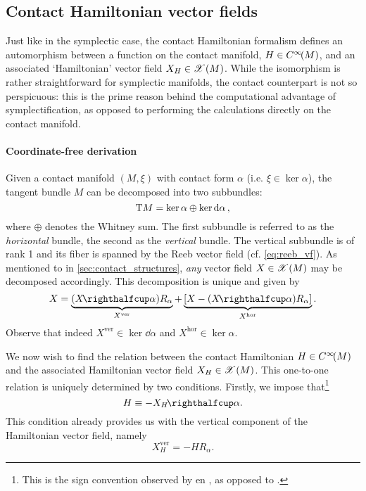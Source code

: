 \subsection{Contact Hamiltonian vector fields}
\label{ssec:contact_ham_vfields}
Just like in the symplectic case, the contact Hamiltonian formalism defines an automorphism between a function on the contact manifold, $H \in C^\infty\!\qty(M)$, and an associated `Hamiltonian' vector field $X_H \in \mathscr{X}\qty(M)$. While the isomorphism is rather straightforward for symplectic manifolds, the contact counterpart is not so perspicuous: this is the prime reason behind the computational advantage of symplectification, as opposed to performing the calculations directly on the contact manifold.
\paragraph{Coordinate-free derivation} Given a contact manifold $(M, \xi)$ with contact form $\alpha$ (i.e. $\xi \in \ker \alpha$), the tangent bundle $M$ can be decomposed into two subbundles: \cite{Libermann1987,Cannas2001}
$$ \mathrm{T}M = \ker \alpha \oplus \ker \dd{\alpha}, $$
where $\oplus$ denotes the Whitney sum. The first subbundle is referred to as the \emph{horizontal} bundle, the second as the \emph{vertical}
 bundle. The vertical subbundle is of rank 1 and its fiber is spanned by the Reeb vector field (cf. \cref{eq:reeb_vf}). As mentioned to in \cref{sec:contact_structures}, \emph{any} vector field $X \in \mathscr{X}\qty(M)$ may be decomposed accordingly. This decomposition is unique and given by
\begin{equation}
    X = \underbrace{(\intpr{X}{\alpha})R_\alpha}_{X^\text{ver}} + \underbrace{\qty[X - (\intpr{X}{\alpha})R_\alpha]}_{X^\text{hor}}.
    \label{eq:contact_vf_decomp}
\end{equation}
Observe that indeed $X^\text{ver} \in \ker \dd{\alpha}$ and $X^\text{hor} \in \ker \alpha$. \cite{Cannas2001,DeLeon2020,Libermann1987}

We now wish to find the relation between the contact Hamiltonian $H \in C^\infty\!\qty(M)$ and the associated Hamiltonian vector field $X_H \in \mathscr{X}\qty(M)$. This one-to-one relation is uniquely determined by two conditions. Firstly, we impose that\footnote{This is the sign convention observed by \citet{Bravetti2017} en \citet{VanderSchaft2021}, as opposed to \citet{Libermann1987}.}
    $$ H \equiv -\intpr{X_H}{\alpha}. $$
This condition already provides us with the vertical component of the Hamiltonian vector field, namely
$$ X_H^\text{ver} = -H R_\alpha. $$

